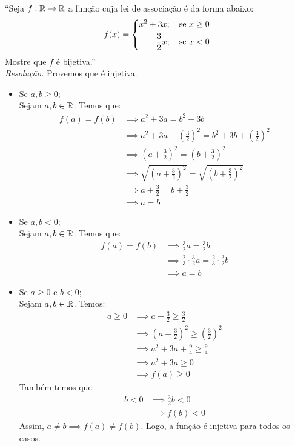 \enquote{Seja $f: \mathbb R \rightarrow \mathbb R$ a função cuja lei de associação é da forma abaixo:
    \begin{displaymath}
        f(x) = \left\{\begin{aligned}
            x^2 + 3x&; \quad \text{se $x \ge 0$} \\
            \frac{3}{2}x&; \quad \text{se $x < 0$}
        \end{aligned}\\ 
        \right.
    \end{displaymath}
Mostre que $f$ é bijetiva.} \\
\emph{Resolução.} Provemos que é injetiva.
\begin{itemize}
    \item Se $a, b \ge 0$; \\
    Sejam $a, b \in \mathbb R$. Temos que:
    \begin{align*}
        f(a) = f(b) & \implies
        a^2 + 3a = b^2 + 3b \\ & \implies
        a^2 + 3a + (\frac{3}{2})^2 = b^2 + 3b + (\frac{3}{2})^2 \\ & \implies
        (a + \frac{3}{2})^2 = (b + \frac{3}{2})^2 \\ & \implies 
        \sqrt{(a + \frac{3}{2})^2} = \sqrt{(b + \frac{3}{2})^2} \\ & \implies
        a + \frac{3}{2} = b + \frac{3}{2} \\ & \implies
        a = b
    \end{align*}
    \item Se $a, b < 0$; \\
    Sejam $a, b \in \mathbb R$. Temos que:
    \begin{align*}
        f(a) = f(b) & \implies \frac{3}{2}a = \frac{3}{2}b \\ & \implies
        \frac{2}{3} \cdot \frac{3}{2}a = \frac{2}{3} \cdot \frac{3}{2}b \\ & \implies
        a = b
    \end{align*}
    \item Se $a \ge 0$ e $b < 0$; \\
    Sejam $a, b \in \mathbb R$. Temos:
    \begin{align*}
        a \ge 0 & \implies a + \frac{3}{2} \ge \frac{3}{2} \\ & \implies
        (a + \frac{3}{2})^2 \ge (\frac{3}{2})^2 \\ & \implies
        a^2 + 3a + \frac{9}{4} \ge \frac{9}{4} \\ & \implies
        a^2 + 3a \ge 0 \\ & \implies
        f(a) \ge 0
    \end{align*}
    Também temos que:
    \begin{align*}
        b < 0 & \implies \frac{3}{2}b < 0 \\ & \implies
        f(b) < 0
    \end{align*}
    Assim, $a \ne b \implies f(a) \ne f(b)$. Logo, a função é injetiva para todos os casos.
\end{itemize}
